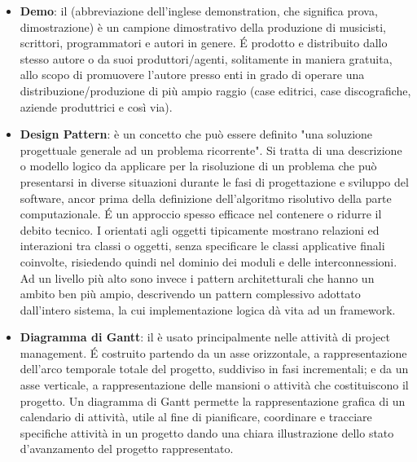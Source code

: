 \begin{itemize}
\item[] \textbf{Demo}: il  (abbreviazione dell'inglese demonstration, che significa prova, dimostrazione) è un campione dimostrativo della produzione di musicisti, scrittori, programmatori e autori in genere. \'E prodotto e distribuito dallo stesso autore o da suoi produttori/agenti, solitamente in maniera gratuita, allo scopo di promuovere l'autore presso enti in grado di operare una distribuzione/produzione di più ampio raggio (case editrici, case discografiche, aziende produttrici e così via).
\item[] \textbf{Design Pattern}: è un concetto che può essere definito "una soluzione progettuale generale ad un problema ricorrente". Si tratta di una descrizione o modello logico da applicare per la risoluzione di un problema che può presentarsi in diverse situazioni durante le fasi di progettazione e sviluppo del software, ancor prima della definizione dell'algoritmo risolutivo della parte computazionale. \'E un approccio spesso efficace nel contenere o ridurre il debito tecnico. I  orientati agli oggetti tipicamente mostrano relazioni ed interazioni tra classi o oggetti, senza specificare le classi applicative finali coinvolte, risiedendo quindi nel dominio dei moduli e delle interconnessioni. Ad un livello più alto sono invece i pattern architetturali che hanno un ambito ben più ampio, descrivendo un pattern complessivo adottato dall'intero sistema, la cui implementazione logica dà vita ad un framework.
\item[] \textbf{Diagramma di Gantt}: il  è usato principalmente nelle attività di project management. É costruito partendo da un asse orizzontale, a rappresentazione  dell'arco temporale totale del progetto, suddiviso in fasi incrementali; e da un asse verticale, a rappresentazione delle mansioni o attività che costituiscono il progetto. Un diagramma di Gantt permette la rappresentazione grafica di un calendario di attività, utile al fine di pianificare, coordinare e tracciare specifiche attività in un progetto dando una chiara illustrazione dello stato d'avanzamento del progetto rappresentato.
\end{itemize}
\newpage

